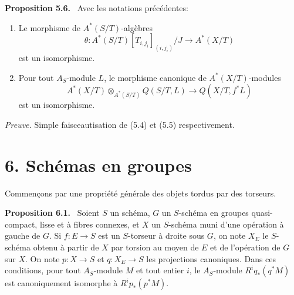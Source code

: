 \documentclass[11pt]{article}
\newenvironment{statement}[1]{\par\medskip\noindent\textbf{#1.}\ }{\par\medskip}
\begin{document}
\begin{statement}{Proposition 5.6}
Avec les notations précédentes:
\begin{enumerate}[label=\alph*)]
\item Le morphisme de $A^*(S/T)$-algèbres
\[
\theta:A^*(S/T)[T_{i,j_i}]_{(i,j_i)}/J\to A^*(X/T)
\]
est un isomorphisme.
\item Pour tout $A_S$-module $L$, le morphisme canonique de $A^*(X/T)$-modules
\[
A^*(X/T)\otimes_{A^*(S/T)}Q(S/T,L)\to Q(X/T,f^*L)
\]
est un isomorphisme.
\end{enumerate}
\end{statement}

\emph{Preuve.} Simple faisceautisation de (5.4) et (5.5) respectivement.

\section*{6. Schémas en groupes}

Commençons par une propriété générale des objets tordus par des torseurs.

\begin{statement}{Proposition 6.1}
Soient $S$ un schéma, $G$ un $S$-schéma en groupes quasi-compact, lisse et à fibres connexes, et $X$ un $S$-schéma muni d'une opération à gauche de $G$. Si $f:E\to S$ est un $S$-torseur à droite sous $G$, on note $X_E$ le $S$-schéma obtenu à partir de $X$ par torsion au moyen de $E$ et de l'opération de $G$ sur $X$. On note $p:X\to S$ et $q:X_E\to S$ les projections canoniques. Dans ces conditions, pour tout $A_S$-module $M$ et tout entier $i$, le $A_S$-module $R^iq_*(q^*M)$ est canoniquement isomorphe à $R^ip_*(p^*M)$.
\end{statement}
\end{document}
